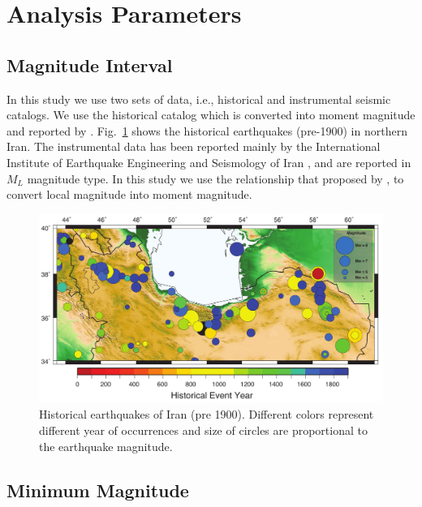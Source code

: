 \newpage
\section{Analysis Parameters}
\subsection{Magnitude Interval}

In this study we use two sets of data, i.e., historical and instrumental seismic catalogs. We use the historical catalog which is converted into moment magnitude and reported by \citep{Karimiparidari2013}. Fig.~\ref{fig:historical} shows the historical earthquakes (pre-1900) in northern Iran. The instrumental data has been reported mainly by the International Institute of Earthquake Engineering and Seismology of Iran \citep{IIEES}, and are reported in $M_L$ magnitude type. In this study we use the relationship that proposed by \citet{Karimiparidari2013}, to convert local magnitude into moment magnitude. 

\begin{figure} [H]
\centering
\includegraphics[scale=0.8]{figures/pdf/Figure2.pdf} 
\caption{Historical earthquakes of Iran (pre 1900). Different colors represent different year of occurrences and size of circles are proportional to the earthquake magnitude. }
\label{fig:historical}
\end{figure}



\subsection{Minimum Magnitude}
